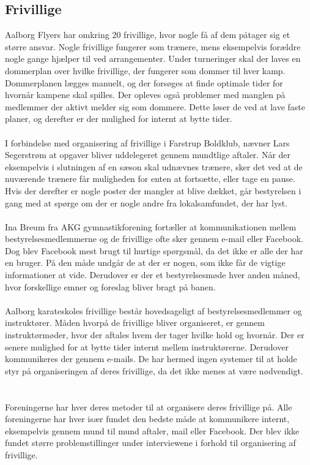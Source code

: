 \subsection*{Frivillige}
Aalborg Flyers har omkring 20 frivillige, hvor nogle få af dem påtager sig et større ansvar. Nogle frivillige fungerer som trænere, mens eksempelvis forældre nogle gange hjælper til ved arrangementer. Under turneringer skal der laves en dommerplan over hvilke frivillige, der fungerer som dommer til hver kamp. Dommerplanen lægges manuelt, og der forsøges at finde optimale tider for hvornår kampene skal spilles. Der opleves også problemer med manglen på medlemmer der aktivt melder sig som dommere. Dette løser de ved at lave faste planer, og derefter er der mulighed for internt at bytte tider.
\\\\
I forbindelse med organisering af frivillige i Farstrup Boldklub, nævner Lars Segerstrøm at opgaver bliver uddelegeret gennem mundtlige aftaler. Når der eksempelvis i slutningen af en sæson skal udnævnes trænere, sker det ved at de nuværende trænere får muligheden for enten at fortsætte, eller tage en pause. Hvis der derefter er nogle poster der mangler at blive dækket, går bestyrelsen i gang med at spørge om der er nogle andre fra lokalsamfundet, der har lyst.
\\\\
Ina Breum fra AKG gymnastikforening fortæller at kommunikationen mellem bestyrelsesmedlemmerne og de frivillige ofte sker gennem e-mail eller Facebook. Dog blev Facebook mest brugt til hurtige spørgsmål, da det ikke er alle der har en bruger. På den måde undgår de at der er nogen, som ikke får de vigtige informationer at vide. Derudover er der et bestyrelsesmøde hver anden måned, hvor forskellige emner og foreslag bliver bragt på banen.
\\\\ %
Aalborg karateskoles frivillige består hovedsageligt af bestyrelsesmedlemmer og instruktører. Måden hvorpå de frivillige bliver organiseret, er gennem instruktørmøder, hvor der aftales hvem der tager hvilke hold og hvornår. Der er senere mulighed for at bytte tider internt mellem instruktørerne. Derudover kommunikeres der gennem e-mails. De har hermed ingen systemer til at holde styr på organiseringen af deres frivillige, da det ikke menes at være nødvendigt.
\\\\\\
Foreningerne har hver deres metoder til at organisere deres frivillige på. Alle foreningerne har hver især fundet den bedste måde at kommunikere internt, eksempelvis gennem mund til mund aftaler, mail eller Facebook. Der blev ikke fundet større problemstillinger under interviewene i forhold til organisering af frivillige.


